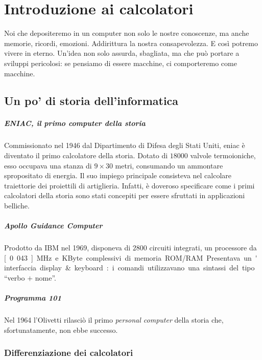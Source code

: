 \documentclass[class=book, crop=false, oneside]{standalone}
\begin{document}
\chapter{Introduzione ai calcolatori}\begin{fquote}Noi che depositeremo in un computer non solo le nostre conoscenze, ma anche memorie, ricordi, emozioni. Addirittura la nostra consapevolezza. E così potremo vivere in eterno. Un'idea non solo assurda, sbagliata, ma che può portare a sviluppi pericolosi: se pensiamo di essere macchine, ci comporteremo come macchine.
 \end{fquote}

\section{Un po' di storia dell'informatica}

\paragraph{ENIAC, il primo computer della storia}
Commissionato nel 1946 dal Dipartimento di Difesa degli Stati Uniti, \acrfull{eniac} è diventato il primo calcolatore della storia.
Dotato di \(18000\) valvole termoioniche, esso occupava una stanza di \(9 \times 30\) metri, consumando un ammontare spropositato di energia.
Il suo impiego principale consisteva nel calcolare traiettorie dei proiettili di artiglieria.
Infatti, è doveroso specificare come i primi calcolatori della storia sono stati concepiti per essere sfruttati in applicazioni belliche.

\paragraph{Apollo Guidance Computer}
Prodotto da IBM nel 1969, disponeva di \(2800\) circuiti integrati, un processore da \unit[0.043]{MHz} e \unit[152]{KByte} complessivi di memoria ROM/RAM.
Presentava un'interfaccia display \& keyboard: i comandi utilizzavano una sintassi del tipo \enquote{verbo \(+\) nome}.

\paragraph{Programma 101}
Nel 1964 l'Olivetti rilasciò il primo \emph{personal computer} della storia che, sfortunatamente, non ebbe successo.

\subsection{Differenziazione dei calcolatori}
\end{document}
